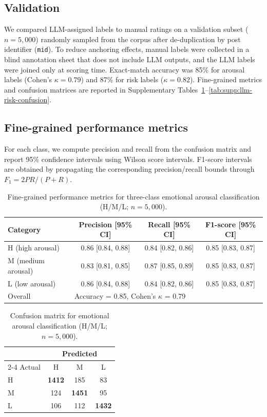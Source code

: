 \documentclass[11pt]{article}
\begin{document}
\subsection{Validation}
We compared LLM-assigned labels to manual ratings on a validation subset ($n=5{,}000$) randomly sampled from the corpus after de-duplication by post identifier (\texttt{mid}). To reduce anchoring effects, manual labels were collected in a blind annotation sheet that does not include LLM outputs, and the LLM labels were joined only at scoring time. Exact-match accuracy was 85\% for arousal labels (Cohen's $\kappa=0.79$) and 87\% for risk labels ($\kappa=0.82$). Fine-grained metrics and confusion matrices are reported in Supplementary Tables~\ref{tab:supp:llm-emotion-metrics}--\ref{tab:supp:llm-risk-confusion}.

\subsection{Fine-grained performance metrics}
\label{supp:s1-fine-grained-metrics}
For each class, we compute precision and recall from the confusion matrix and report 95\% confidence intervals using Wilson score intervals. F1-score intervals are obtained by propagating the corresponding precision/recall bounds through $F_1=2PR/(P+R)$.
\begin{table}[H]
  \centering
  \caption{Fine-grained performance metrics for three-class emotional arousal classification (H/M/L; $n=5{,}000$).}
  \label{tab:supp:llm-emotion-metrics}
  \footnotesize
  \begin{tabular}{@{}lccc@{}}
    \toprule
    Category & Precision [95\% CI] & Recall [95\% CI] & F1-score [95\% CI] \\
    \midrule
    H (high arousal) & 0.86 [0.84, 0.88] & 0.84 [0.82, 0.86] & 0.85 [0.83, 0.87] \\
    M (medium arousal) & 0.83 [0.81, 0.85] & 0.87 [0.85, 0.89] & 0.85 [0.83, 0.87] \\
    L (low arousal) & 0.86 [0.84, 0.88] & 0.84 [0.82, 0.86] & 0.85 [0.83, 0.87] \\
    \midrule
    Overall & \multicolumn{3}{l}{Accuracy = 0.85, Cohen's $\kappa$ = 0.79} \\
    \bottomrule
  \end{tabular}
\end{table}

\begin{table}[H]
  \centering
  \caption{Confusion matrix for emotional arousal classification (H/M/L; $n=5{,}000$).}
  \label{tab:supp:llm-emotion-confusion}
  \footnotesize
  \begin{tabular}{@{}lccc@{}}
    \toprule
    & \multicolumn{3}{c}{Predicted} \\
    \cmidrule(l){2-4}
    Actual & H & M & L \\
    \midrule
    H & \textbf{1412} & 185 & 83 \\
    M & 124 & \textbf{1451} & 95 \\
    L & 106 & 112 & \textbf{1432} \\
    \bottomrule
  \end{tabular}
\end{table}
\end{document}
